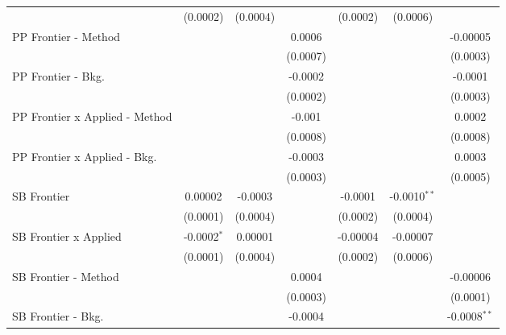 \begin{tabular}{lcccccc}
                                  & (0.0002)       & (0.0004)       &                & (0.0002)  & (0.0006)       &   \\   
   PP Frontier - Method           &                &                & 0.0006         &           &                & -0.00005\\   
                                  &                &                & (0.0007)       &           &                & (0.0003)\\   
   PP Frontier - Bkg.             &                &                & -0.0002        &           &                & -0.0001\\   
                                  &                &                & (0.0002)       &           &                & (0.0003)\\   
   PP Frontier x Applied - Method &                &                & -0.001         &           &                & 0.0002\\   
                                  &                &                & (0.0008)       &           &                & (0.0008)\\   
   PP Frontier x Applied - Bkg.   &                &                & -0.0003        &           &                & 0.0003\\   
                                  &                &                & (0.0003)       &           &                & (0.0005)\\   
   SB Frontier                    & 0.00002        & -0.0003        &                & -0.0001   & -0.0010$^{**}$ &   \\   
                                  & (0.0001)       & (0.0004)       &                & (0.0002)  & (0.0004)       &   \\   
   SB Frontier x Applied          & -0.0002$^{*}$  & 0.00001        &                & -0.00004  & -0.00007       &   \\   
                                  & (0.0001)       & (0.0004)       &                & (0.0002)  & (0.0006)       &   \\   
   SB Frontier - Method           &                &                & 0.0004         &           &                & -0.00006\\   
                                  &                &                & (0.0003)       &           &                & (0.0001)\\   
   SB Frontier - Bkg.             &                &                & -0.0004        &           &                & -0.0008$^{**}$\\   

\end{tabular}
